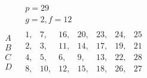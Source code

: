\documentclass[twoside,12pt, showframe]{memoir}
\begin{document}
\[\begin{aligned}
& \begin{array}{c} p=29 \\  g=2, f=12 \end{array} \\
\begin{array}{l} A \\ B \\ C \\D \end{array} & 
\begin{array}{|rrrrrrr} 1,&7,&16,&20,&23,&24,&25\\ 
2,& 3,&11,&14,&17,&19,&21 \\ 
4,& 5,&6,&9,&13,&22,&28 \\ 
8,& 10,& 12,&15,&18,& 26,&27
\end{array} \\
\end{aligned}\]
%
\end{document}

